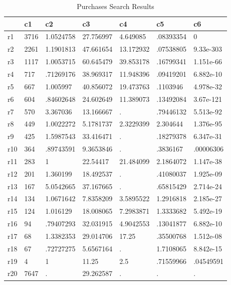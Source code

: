 \begin{table}[htbp]
\caption{\label{clabel} Purchases Search Results}\centering\medskip
\begin{tabular}{|l|l|l|l|l|l|l|}\hline  
 & c1  & c2  & c3  & c4  & c5  & c6  \\ \hline  
r1 & 3716 & 1.0524758 & 27.756997 & 4.649085 & .08393354 & 0 \\ \hline 
r2 & 2261 & 1.1901813 & 47.661654 & 13.172932 & .07538805 & 9.33e-303 \\ \hline 
r3 & 1117 & 1.0053715 & 60.645479 & 39.853178 & .16799341 & 1.151e-66 \\ \hline 
r4 & 717 & .71269176 & 38.969317 & 11.948396 & .09419201 & 6.882e-10 \\ \hline 
r5 & 667 & 1.005997 & 40.856072 & 19.473763 & .1103946 & 4.978e-32 \\ \hline 
r6 & 604 & .84602648 & 24.602649 & 11.389073 & .13492084 & 3.67e-121 \\ \hline 
r7 & 570 & 3.367036 & 13.166667 & . & .79446132 & 5.513e-92 \\ \hline 
r8 & 449 & 1.0022272 & 5.1781737 & 2.3229399 & 2.304644 & 1.376e-95 \\ \hline 
r9 & 425 & 1.5987543 & 33.416471 & . & .18279378 & 6.347e-31 \\ \hline 
r10 & 364 & .89743591 & 9.3653846 & . & .3836167 & .00006306 \\ \hline 
r11 & 283 & 1 & 22.54417 & 21.484099 & 2.1864072 & 1.147e-38 \\ \hline 
r12 & 201 & 1.360199 & 18.492537 & . & .41080037 & 1.925e-09 \\ \hline 
r13 & 167 & 5.0542665 & 37.167665 & . & .65815429 & 2.714e-24 \\ \hline 
r14 & 134 & 1.0671642 & 7.8358209 & 3.5895522 & 1.2916818 & 2.185e-27 \\ \hline 
r15 & 124 & 1.016129 & 18.008065 & 7.2983871 & 1.3333682 & 5.492e-19 \\ \hline 
r16 & 94 & .79407293 & 32.031915 & 4.9042553 & .13041877 & 6.882e-10 \\ \hline 
r17 & 68 & 1.3382353 & 29.014706 & 17.25 & .35500768 & 1.512e-08 \\ \hline 
r18 & 67 & .72727275 & 5.6567164 & . & 1.7108065 & 8.842e-15 \\ \hline 
r19 & 4 & 1 & 11.25 & 2.5 & .71559966 & .04549591 \\ \hline 
r20 & 7647 & . & 29.262587 & . & . & . \\ \hline 
  \end{tabular}
\end{table}
